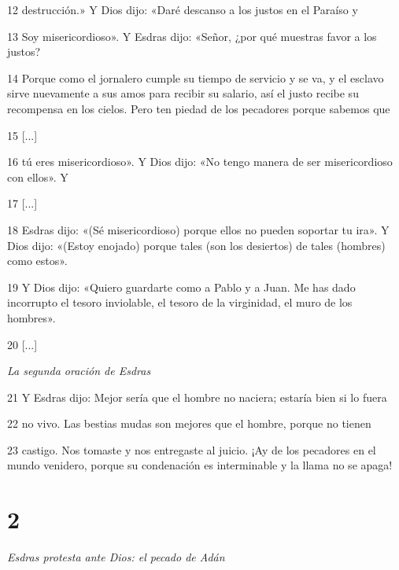\par 12 destrucción.» Y Dios dijo: «Daré descanso a los justos en el Paraíso y

\par 13 Soy misericordioso». Y Esdras dijo: «Señor, ¿por qué muestras favor a los justos?

\par 14 Porque como el jornalero cumple su tiempo de servicio y se va, y el esclavo sirve nuevamente a sus amos para recibir su salario, así el justo recibe su recompensa en los cielos. Pero ten piedad de los pecadores porque sabemos que

\par 15 [...]

\par 16 tú eres misericordioso». Y Dios dijo: «No tengo manera de ser misericordioso con ellos». Y

\par 17 [...]

\par 18 Esdras dijo: «(Sé misericordioso) porque ellos no pueden soportar tu ira». Y Dios dijo: «(Estoy enojado) porque tales (son los desiertos) de tales (hombres) como estos».

\par 19 Y Dios dijo: «Quiero guardarte como a Pablo y a Juan. Me has dado incorrupto el tesoro inviolable, el tesoro de la virginidad, el muro de los hombres».

\par 20 [...]

\par \textit{La segunda oración de Esdras}

\par 21 Y Esdras dijo: Mejor sería que el hombre no naciera; estaría bien si lo fuera

\par 22 no vivo. Las bestias mudas son mejores que el hombre, porque no tienen

\par 23 castigo. Nos tomaste y nos entregaste al juicio. ¡Ay de los pecadores en el mundo venidero, porque su condenación es interminable y la llama no se apaga!

\chapter{2}

\par \textit{Esdras protesta ante Dios: el pecado de Adán}

